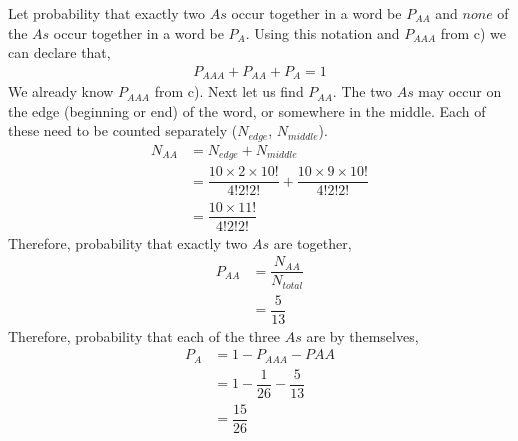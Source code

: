 \begin{parts}
\begin{solution}[\halfpage]
    Let probability that exactly two $As$ occur together in a
    word be $P_{AA}$ and $none$ of the $As$ occur together in
    a word be $P_A$. Using this notation and $P_{AAA}$ from c) 
    we can declare that,
    \begin{align}
      P_{AAA} + P_{AA} + P_{A} = 1
    \end{align}
    We already know $P_{AAA}$ from c). Next let us find
    $P_{AA}$. The two $As$ may occur on the edge (beginning 
    or end) of the word, or somewhere in the middle. Each of 
    these need to be counted separately ($N_{edge}$, 
    $N_{middle}$).
    \begin{align}
      N_{AA} &= N_{edge} + N_{middle} \\
             &= \dfrac{10\times 2\times 10!}{4!2!2!} +
                \dfrac{10\times 9\times 10!}{4!2!2!} \\
             &= \dfrac{10\times 11!}{4!2!2!}   
    \end{align}
    Therefore, probability that exactly two $As$ are together,
    \begin{align}
      P_{AA} &= \dfrac{N_{AA}}{N_{total}} \\
             &= \dfrac{5}{13}
    \end{align}
    Therefore, probability that each of the three $As$ are by
    themselves,
    \begin{align}
      P_{A} &= 1 - P_{AAA} - P{AA} \\
            &= 1 - \dfrac{1}{26} - \dfrac{5}{13} \\
            &= \dfrac{15}{26}
    \end{align}  
  \end{solution}

\end{parts}

